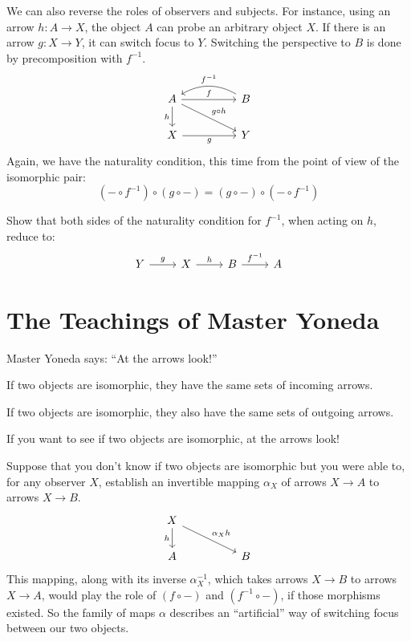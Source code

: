 \documentclass[DaoFP]{subfiles}
\begin{document}
We can also reverse the roles of observers and subjects. For instance, using an arrow $h \colon A \to X$, the object $A$ can probe an arbitrary object $X$. If there is an arrow $g \colon X \to Y$, it can switch focus to $Y$. Switching the perspective to $B$ is done by precomposition with $f^{-1}$.
\[
 \begin{tikzcd}
 A
 \arrow[rr, "f"]
 \arrow[d, "h"']
 \arrow[rrd, "g\circ h"]
 && B
  \arrow[ll, bend right,  "f^{-1}"']
 \\
 X
 \arrow[rr, "g"']
  && Y
 \end{tikzcd}
\]
Again, we have the naturality condition, this time from the point of view of the isomorphic pair:
\[(- \circ f^{-1}) \circ (g \circ -) = (g \circ -) \circ (- \circ f^{-1}) \]

\begin{exercise}
Show that both sides of the naturality condition for $f^{-1}$, when acting on $h$, reduce to:
\[
 \begin{tikzcd}
 Y \arrow[r, "g"] &X \arrow[r, "h"] & B \arrow[r, "f^{-1}"] & A
\end{tikzcd}
\]

\end{exercise}

\section{The Teachings of Master Yoneda}

Master Yoneda says: ``At the arrows look!''

If two objects are isomorphic, they have the same sets of incoming arrows. 

If two objects are isomorphic, they also have the same sets of outgoing arrows.

If you want to see if two objects are isomorphic, at the arrows look!

\medskip

Suppose that you don't know if two objects are isomorphic but you were able to, for any observer $X$, establish an invertible mapping $\alpha_X$ of arrows $X \to A$ to arrows $X \to B$. 
\[
 \begin{tikzcd}
 X
 \arrow[d, "h"']
 \arrow[rrd, "\alpha_X h"]
  \\
 A
  && B
 \end{tikzcd}
\]
This mapping, along with its inverse $\alpha^{-1}_X$, which takes arrows $X \to B$ to arrows $X \to A$, would play the role of $(f \circ -)$ and $(f^{-1} \circ -)$, if those morphisms existed. So the family of maps $\alpha$ describes an ``artificial'' way of switching focus between our two objects.
\end{document}
